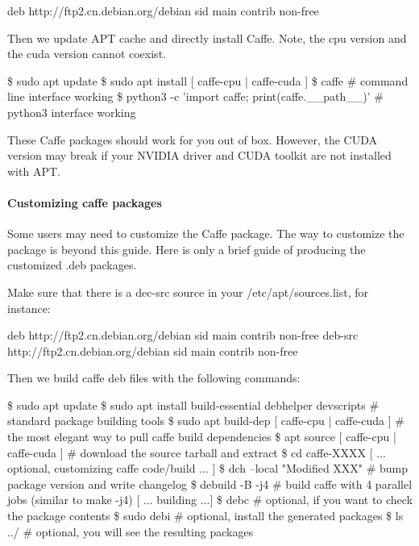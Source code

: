 \begin{DoxyCode}
deb http://ftp2.cn.debian.org/debian sid main contrib non-free
\end{DoxyCode}


Then we update A\+PT cache and directly install Caffe. Note, the cpu version and the cuda version cannot coexist.


\begin{DoxyCode}
\$ sudo apt update
\$ sudo apt install [ caffe-cpu | caffe-cuda ]
\$ caffe                                              \# command line interface working
\$ python3 -c 'import caffe; print(caffe.\_\_path\_\_)'   \# python3 interface working
\end{DoxyCode}


These Caffe packages should work for you out of box. However, the C\+U\+DA version may break if your N\+V\+I\+D\+IA driver and C\+U\+DA toolkit are not installed with A\+PT.

\paragraph*{Customizing caffe packages}

Some users may need to customize the Caffe package. The way to customize the package is beyond this guide. Here is only a brief guide of producing the customized {\ttfamily .deb} packages.

Make sure that there is a {\ttfamily dec-\/src} source in your {\ttfamily /etc/apt/sources.list}, for instance\+:


\begin{DoxyCode}
deb http://ftp2.cn.debian.org/debian sid main contrib non-free
deb-src http://ftp2.cn.debian.org/debian sid main contrib non-free
\end{DoxyCode}


Then we build caffe deb files with the following commands\+:


\begin{DoxyCode}
\$ sudo apt update
\$ sudo apt install build-essential debhelper devscripts  \# standard package building tools
\$ sudo apt build-dep [ caffe-cpu | caffe-cuda ]          \# the most elegant way to pull caffe build
       dependencies
\$ apt source [ caffe-cpu | caffe-cuda ]                  \# download the source tarball and extract
\$ cd caffe-XXXX
[ ... optional, customizing caffe code/build ... ]
\$ dch --local "Modified XXX"                             \# bump package version and write changelog
\$ debuild -B -j4                                         \# build caffe with 4 parallel jobs (similar to
       make -j4)
[ ... building ...]
\$ debc                                                   \# optional, if you want to check the package
       contents
\$ sudo debi                                              \# optional, install the generated packages
\$ ls ../                                                 \# optional, you will see the resulting packages
\end{DoxyCode}


